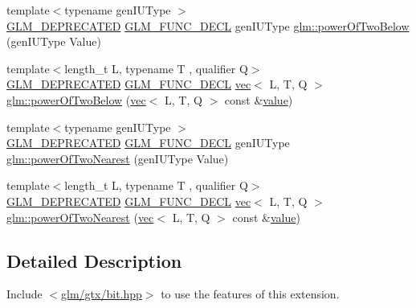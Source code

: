 \begin{DoxyCompactItemize}
\item 
{\footnotesize template$<$typename gen\+I\+U\+Type $>$ }\\\mbox{\hyperlink{setup_8hpp_a8edfb48cdc249a3ee48406bf179023dc}{G\+L\+M\+\_\+\+D\+E\+P\+R\+E\+C\+A\+T\+ED}} \mbox{\hyperlink{setup_8hpp_ab2d052de21a70539923e9bcbf6e83a51}{G\+L\+M\+\_\+\+F\+U\+N\+C\+\_\+\+D\+E\+CL}} gen\+I\+U\+Type \mbox{\hyperlink{group__gtx__bit_ga3de7df63c589325101a2817a56f8e29d}{glm\+::power\+Of\+Two\+Below}} (gen\+I\+U\+Type Value)
\item 
{\footnotesize template$<$length\+\_\+t L, typename T , qualifier Q$>$ }\\\mbox{\hyperlink{setup_8hpp_a8edfb48cdc249a3ee48406bf179023dc}{G\+L\+M\+\_\+\+D\+E\+P\+R\+E\+C\+A\+T\+ED}} \mbox{\hyperlink{setup_8hpp_ab2d052de21a70539923e9bcbf6e83a51}{G\+L\+M\+\_\+\+F\+U\+N\+C\+\_\+\+D\+E\+CL}} \mbox{\hyperlink{structglm_1_1vec}{vec}}$<$ L, T, Q $>$ \mbox{\hyperlink{group__gtx__bit_gaf78ddcc4152c051b2a21e68fecb10980}{glm\+::power\+Of\+Two\+Below}} (\mbox{\hyperlink{structglm_1_1vec}{vec}}$<$ L, T, Q $>$ const \&\mbox{\hyperlink{_s_d_l__opengl__glext_8h_a8ad81492d410ff2ac11f754f4042150f}{value}})
\item 
{\footnotesize template$<$typename gen\+I\+U\+Type $>$ }\\\mbox{\hyperlink{setup_8hpp_a8edfb48cdc249a3ee48406bf179023dc}{G\+L\+M\+\_\+\+D\+E\+P\+R\+E\+C\+A\+T\+ED}} \mbox{\hyperlink{setup_8hpp_ab2d052de21a70539923e9bcbf6e83a51}{G\+L\+M\+\_\+\+F\+U\+N\+C\+\_\+\+D\+E\+CL}} gen\+I\+U\+Type \mbox{\hyperlink{group__gtx__bit_ga5f65973a5d2ea38c719e6a663149ead9}{glm\+::power\+Of\+Two\+Nearest}} (gen\+I\+U\+Type Value)
\item 
{\footnotesize template$<$length\+\_\+t L, typename T , qualifier Q$>$ }\\\mbox{\hyperlink{setup_8hpp_a8edfb48cdc249a3ee48406bf179023dc}{G\+L\+M\+\_\+\+D\+E\+P\+R\+E\+C\+A\+T\+ED}} \mbox{\hyperlink{setup_8hpp_ab2d052de21a70539923e9bcbf6e83a51}{G\+L\+M\+\_\+\+F\+U\+N\+C\+\_\+\+D\+E\+CL}} \mbox{\hyperlink{structglm_1_1vec}{vec}}$<$ L, T, Q $>$ \mbox{\hyperlink{group__gtx__bit_gac87e65d11e16c3d6b91c3bcfaef7da0b}{glm\+::power\+Of\+Two\+Nearest}} (\mbox{\hyperlink{structglm_1_1vec}{vec}}$<$ L, T, Q $>$ const \&\mbox{\hyperlink{_s_d_l__opengl__glext_8h_a8ad81492d410ff2ac11f754f4042150f}{value}})
\end{DoxyCompactItemize}


\subsection{Detailed Description}
Include $<$\mbox{\hyperlink{bit_8hpp}{glm/gtx/bit.\+hpp}}$>$ to use the features of this extension.

